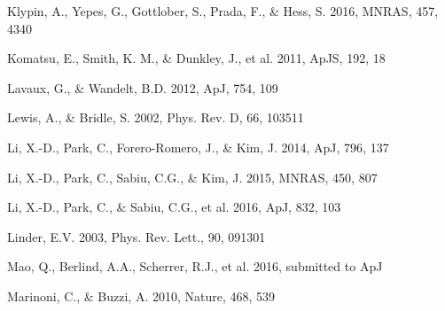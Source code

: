\documentclass[iop]{emulateapj}
\begin{document}
\begin{thebibliography}{}
Klypin, A., Yepes, G., Gottlober, S., Prada, F., \& Hess, S. 2016,
MNRAS, 457, 4340%

Komatsu, E., Smith, K. M., \& Dunkley, J., et al. 2011, ApJS, 192, 18  





Lavaux, G., \& Wandelt, B.D. 2012, ApJ, 754, 109  


Lewis, A., \& Bridle, S. 2002, Phys. Rev. D, 66, 103511



Li, X.-D., Park, C., Forero-Romero, J., \& Kim, J. 2014, ApJ, 796, 137

Li, X.-D., Park, C., Sabiu, C.G., \& Kim, J. 2015, MNRAS, 450, 807 

%
Li, X.-D., Park, C., \& Sabiu, C.G., et al. 2016, ApJ, 832, 103

Linder, E.V. 2003, Phys. Rev. Lett., 90, 091301



Mao, Q., Berlind, A.A., Scherrer, R.J., et al. 2016, submitted to ApJ

Marinoni, C., \& Buzzi, A. 2010, Nature, 468, 539  


\end{thebibliography}
\end{document}
